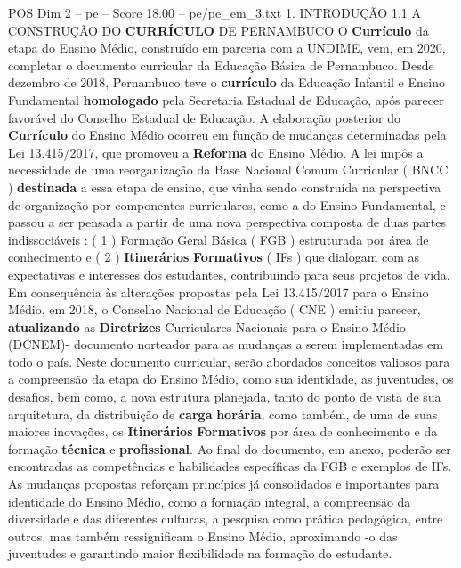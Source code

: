 \begin{textsample}{POS Dim 2 – pe – Score 18.00 – pe/pe\_em\_3.txt}  \label{ex:f2_pos_255}
1.
INTRODUÇÃO 1.1 A CONSTRUÇÃO DO \textbf{CURRÍCULO} DE PERNAMBUCO O \textbf{Currículo} da etapa do Ensino Médio, construído em parceria com a UNDIME, vem, em 2020, completar o documento curricular da Educação Básica de Pernambuco.
Desde dezembro de 2018, Pernambuco teve o \textbf{currículo} da Educação Infantil e Ensino Fundamental \textbf{homologado} pela Secretaria Estadual de Educação, após parecer favorável do Conselho Estadual de Educação.
A elaboração posterior do \textbf{Currículo} do Ensino Médio ocorreu em função de mudanças determinadas pela Lei 13.415/2017, que promoveu a \textbf{Reforma} do Ensino Médio.
A lei impôs a necessidade de uma reorganização da Base Nacional Comum Curricular ( BNCC ) \textbf{destinada} a essa etapa de ensino, que vinha sendo construída na perspectiva de organização por componentes curriculares, como a do Ensino Fundamental, e passou a ser pensada a partir de uma nova perspectiva composta de duas partes indissociáveis : ( 1 ) Formação Geral Básica ( FGB ) estruturada por área de conhecimento e ( 2 ) \textbf{Itinerários} \textbf{Formativos} ( IFs ) que dialogam com as expectativas e interesses dos estudantes, contribuindo para seus projetos de vida.
Em consequência às alterações propostas pela Lei 13.415/2017 para o Ensino Médio, em 2018, o Conselho Nacional de Educação ( CNE ) emitiu parecer, \textbf{atualizando} as \textbf{Diretrizes} Curriculares Nacionais para o Ensino Médio (DCNEM)- documento norteador para as mudanças a serem implementadas em todo o país.
Neste documento curricular, serão abordados conceitos valiosos para a compreensão da etapa do Ensino Médio, como sua identidade, as juventudes, os desafios, bem como, a nova estrutura planejada, tanto do ponto de vista de sua arquitetura, da distribuição de \textbf{carga} \textbf{horária}, como também, de uma de suas maiores inovações, os \textbf{Itinerários} \textbf{Formativos} por área de conhecimento e da formação \textbf{técnica} e \textbf{profissional}.
Ao final do documento, em anexo, poderão ser encontradas as competências e habilidades específicas da FGB e exemplos de IFs.
As mudanças propostas reforçam princípios já consolidados e importantes para identidade do Ensino Médio, como a formação integral, a compreensão da diversidade e das diferentes culturas, a pesquisa como prática pedagógica, entre outros, mas também ressignificam o Ensino Médio, aproximando -o das juventudes e garantindo maior flexibilidade na formação do estudante.

\end{textsample}
